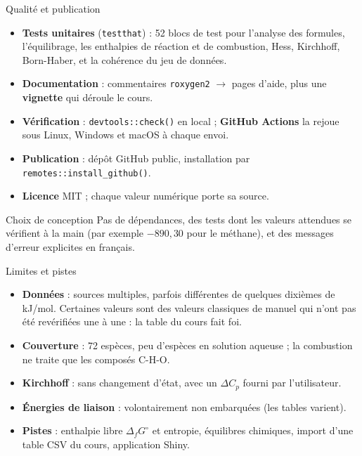 \documentclass[aspectratio=169,10pt]{beamer}
\begin{document}
\begin{frame}{Qualité et publication}
  \begin{itemize}
    \item \textbf{Tests unitaires} (\texttt{testthat}) : 52 blocs de test pour
      l'analyse des formules, l'équilibrage, les enthalpies de réaction et de
      combustion, Hess, Kirchhoff, Born-Haber, et la cohérence du jeu de données.
    \item \textbf{Documentation} : commentaires \texttt{roxygen2} $\to$ pages
      d'aide, plus une \textbf{vignette} qui déroule le cours.
    \item \textbf{Vérification} : \texttt{devtools::check()} en local ;
      \textbf{GitHub Actions} la rejoue sous Linux, Windows et macOS à chaque envoi.
    \item \textbf{Publication} : dépôt GitHub public, installation par
      \texttt{remotes::install\_github()}.
    \item \textbf{Licence} MIT ; chaque valeur numérique porte sa source.
  \end{itemize}
  \vspace{2mm}
  \begin{block}{Choix de conception}
    Pas de dépendances, des tests dont les valeurs attendues se vérifient à la
    main (par exemple $-890{,}30$ pour le méthane), et des messages d'erreur
    explicites en français.
  \end{block}
\end{frame}

\begin{frame}{Limites et pistes}
  \begin{itemize}
    \item \textbf{Données} : sources multiples, parfois différentes de quelques
      dixièmes de kJ/mol. Certaines valeurs sont des valeurs classiques de manuel
      qui n'ont pas été revérifiées une à une : la table du cours fait foi.
    \item \textbf{Couverture} : 72 espèces, peu d'espèces en solution aqueuse ; la
      combustion ne traite que les composés C-H-O.
    \item \textbf{Kirchhoff} : sans changement d'état, avec un $\Delta C_p$
      fourni par l'utilisateur.
    \item \textbf{Énergies de liaison} : volontairement non embarquées (les
      tables varient).
    \item \textbf{Pistes} : enthalpie libre $\Delta_f G^{\circ}$ et entropie,
      équilibres chimiques, import d'une table CSV du cours, application Shiny.
  \end{itemize}
\end{frame}
\end{document}
